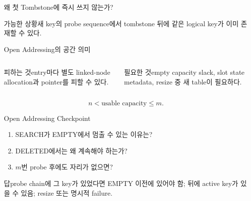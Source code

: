 \begin{frame}{왜 첫 Tombstone에 즉시 쓰지 않는가?}
\centering{}
\begin{block}{가능한 상황}새 key의 probe sequence에서 tombstone 뒤에 같은 logical key가 이미 존재할 수 있다.\end{block}
\end{frame}
\begin{frame}{Open Addressing의 공간 의미}
\begin{columns}[T]
\begin{block}{피하는 것}entry마다 별도 linked-node allocation과 pointer를 피할 수 있다.\end{block}
\begin{alertblock}{필요한 것}empty capacity slack, slot state metadata, resize 중 새 table이 필요하다.\end{alertblock}
\end{columns}
\[
n<\text{usable capacity}\le m.
\]
\end{frame}
\begin{frame}{Open Addressing Checkpoint}
\begin{enumerate}\item SEARCH가 EMPTY에서 멈출 수 있는 이유는?\item DELETED에서는 왜 계속해야 하는가?\item $m$번 probe 후에도 자리가 없으면?\end{enumerate}
\begin{exampleblock}{답}probe chain에 그 key가 있었다면 EMPTY 이전에 있어야 함; 뒤에 active key가 있을 수 있음; resize 또는 명시적 failure.\end{exampleblock}
\end{frame}
